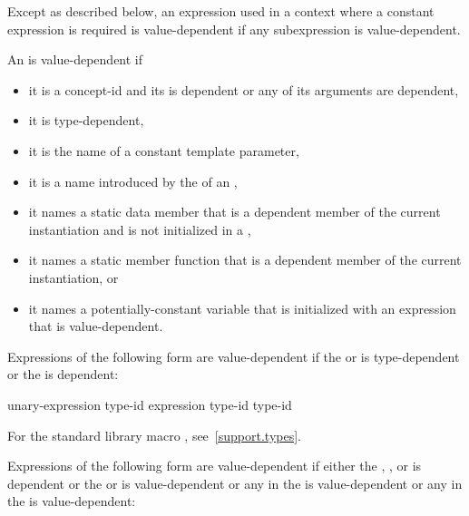 \pnum
Except as described below, an expression used in a context where a
constant expression is required is value-dependent if any
subexpression is value-dependent.

\pnum
An
is value-dependent if
\begin{itemize}
\item
it is a concept-id and
its  is dependent or
any of its arguments are dependent,
\item
it is type-dependent,
\item
it is the name of a constant template parameter,
\item
it is a name introduced by the 
of an ,
\item
it names a static data member that is a dependent member of the current
instantiation and is not initialized in a ,
\item
it names a static member function that is a dependent member of the current
instantiation, or
\item
it names a potentially-constant variable
that is initialized with an expression that is value-dependent.
\end{itemize}

Expressions of the following form are value-dependent if the
 or 
is type-dependent or the
is dependent:

\begin{ncsimplebnf}
 unary-expression\br
{} \terminal{(} type-id \terminal{)}\br
{} \terminal{(} expression \terminal{)}\br
{} \terminal{(} type-id \terminal{)}\br
{} \terminal{(} type-id \terminal{)}
\end{ncsimplebnf}

\begin{note}
For the standard library macro ,
see~\ref{support.types}.
\end{note}

\pnum
Expressions of the following form are value-dependent if either the
,
, or
is dependent or the
or
is value-dependent or
any  in the 
is value-dependent or
any  in the 
is value-dependent:


